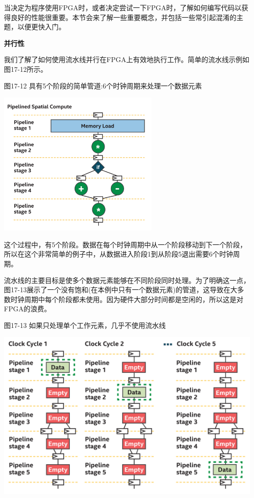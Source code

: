 当决定为程序使用FPGA时，或者决定尝试一下FPGA时，了解如何编写代码以获得良好的性能很重要。本节会来了解一些重要概念，并包括一些常引起混淆的主题，以便更快入门。\par

\hspace*{\fill} \par %
\textbf{并行性}

我们了解了如何使用流水线并行在FPGA上有效地执行工作。简单的流水线示例如图17-12所示。\par

\hspace*{\fill} \par %
图17-12 具有5个阶段的简单管道:6个时钟周期来处理一个数据元素
\begin{center}
	\includegraphics[width=0.6\textwidth]{content/chapter-17/images/11}
\end{center}

这个过程中，有5个阶段。数据在每个时钟周期中从一个阶段移动到下一个阶段，所以在这个非常简单的例子中，从数据进入阶段1到从阶段5退出需要6个时钟周期。\par

流水线的主要目标是使多个数据元素能够在不同阶段同时处理。为了明确这一点，图17-13展示了一个没有饱和(在本例中只有一个数据元素)的管道，这导致在大多数时钟周期中每个阶段都未使用。因为硬件大部分时间都是空闲的，所以这是对FPGA的浪费。\par

\hspace*{\fill} \par %
图17-13 如果只处理单个工作元素，几乎不使用流水线
\begin{center}
	\includegraphics[width=1.0\textwidth]{content/chapter-17/images/12}
\end{center}

